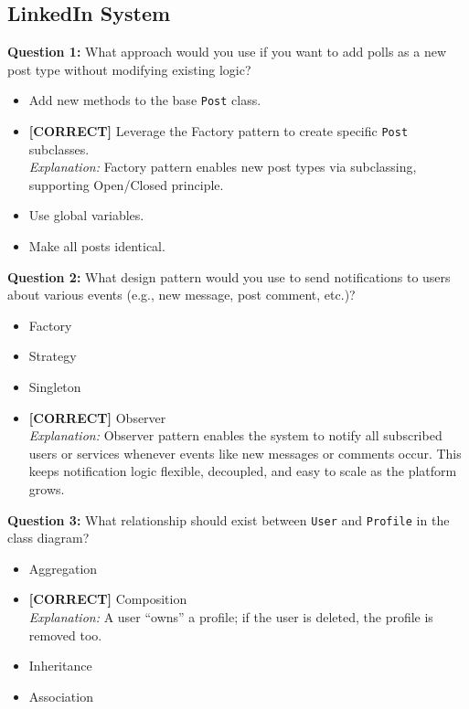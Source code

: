 \subsection*{LinkedIn System}
\vspace{0.3cm}
\noindent
\textbf{Question 1:} What approach would you use if you want to add polls as a new post type without modifying existing logic?
\\[0.2cm]
\begin{itemize}
 \item Add new methods to the base \texttt{Post} class.
 \item \textbf{[CORRECT]} Leverage the Factory pattern to create specific \texttt{Post} subclasses.
\\[0.1cm]
\textit{Explanation:} 
Factory pattern enables new post types via subclassing, supporting Open/Closed principle.
 \item Use global variables.
 \item Make all posts identical.
\end{itemize}
\vspace{0.3cm}
\noindent
\textbf{Question 2:} What design pattern would you use to send notifications to users about various events (e.g., new message, post comment, etc.)?
\\[0.2cm]
\begin{itemize}
 \item Factory
 \item Strategy
 \item Singleton
 \item \textbf{[CORRECT]} Observer
\\[0.1cm]
\textit{Explanation:} 
Observer pattern enables the system to notify all subscribed users or services whenever events like new messages or comments occur. This keeps notification logic flexible, decoupled, and easy to scale as the platform grows.
\end{itemize}
\vspace{0.3cm}
\noindent
\textbf{Question 3:} What relationship should exist between \texttt{User} and \texttt{Profile} in the class diagram?
\\[0.2cm]
\begin{itemize}
 \item Aggregation
 \item \textbf{[CORRECT]} Composition
\\[0.1cm]
\textit{Explanation:} 
A user ``owns'' a profile; if the user is deleted, the profile is removed too.
 \item Inheritance
 \item Association
\end{itemize}
